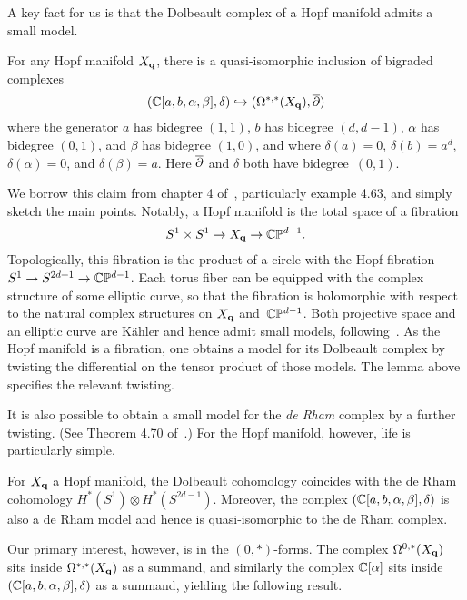 A key fact for us is that the Dolbeault complex of a Hopf manifold admits a small model.

\begin{lem}\label{lem:tanre}
For any Hopf manifold $X_{\bf q}$, there is a quasi-isomorphic inclusion of bigraded complexes
\[
(\mathbb C[a, b, \alpha, \beta], \delta) \hookrightarrow (\Omega^{*,*}(X_{\bf q}),\overline{\partial})
\]
where the generator $a$ has bidegree $(1,1)$, $b$ has bidegree $(d,d-1)$, $\alpha$ has bidegree $(0,1)$, and $\beta$ has bidegree $(1,0)$, and where $\delta(a) = 0$, $\delta(b) = a^{d}$, $\delta(\alpha) = 0$, and $\delta(\beta) = a$.
Here $\overline{\partial}$ and $\delta$ both have bidegree~$(0,1)$.
\end{lem}

We borrow this claim from chapter 4 of~\cite{Tanre}, particularly example 4.63,
and simply sketch the main points.
Notably, a Hopf manifold is the total space of a fibration
\[
S^1 \times S^1 \to X_{\bf q} \to \mathbb C\mathbb P^{d-1}.
\]
Topologically, this fibration is the product of a circle with the Hopf fibration $S^1 \to S^{2d+1} \to \mathbb C\mathbb P^{d-1}$. 
Each torus fiber can be equipped with the complex structure of some elliptic curve, so that the fibration is holomorphic with respect to the natural complex structures on $X_{\bf q}$ and~$\mathbb C\mathbb P^{d-1}$.
Both projective space and an elliptic curve are K\"ahler and hence admit small models, 
following~\cite{DGMS}.
As the Hopf manifold is a fibration, one obtains a model for its Dolbeault complex by twisting the differential on the tensor product of those models.
The lemma above specifies the relevant twisting.

It is also possible to obtain a small model for the {\em de Rham} complex by a further twisting. 
(See Theorem 4.70 of~\cite{Tanre}.)
For the Hopf manifold, however, life is particularly simple.

\begin{lem}
For $X_{\bf q}$ a Hopf manifold,
the Dolbeault cohomology coincides with the de Rham cohomology $H^*(S^1) \otimes H^*(S^{2d-1})$.
Moreover, the complex $(\mathbb C[a, b, \alpha, \beta], \delta)$ is also a de Rham model and hence is quasi-isomorphic to the de Rham complex.
\end{lem}

Our primary interest, however, is in the $(0,*)$-forms.
The complex $\Omega^{0, *}(X_{\bf q})$ sits inside $\Omega^{*, *}(X_{\bf q})$ as a summand,
and similarly the complex $\mathbb C[\alpha]$ sits inside $(\mathbb C[a, b, \alpha, \beta], \delta)$ as a summand,
yielding the following result.

